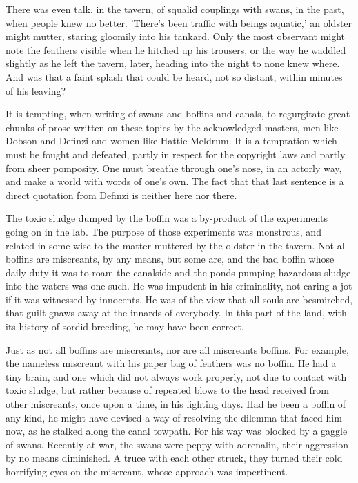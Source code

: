 There was even talk, in the tavern, of squalid couplings with swans, in the past, when people knew no better. 'There's been traffic with beings aquatic,' an oldster might mutter, staring gloomily into his tankard. Only the most observant might note the feathers visible when he hitched up his trousers, or the way he waddled slightly as he left the tavern, later, heading into the night to none knew where. And was that a faint splash that could be heard, not so distant, within minutes of his leaving?

It is tempting, when writing of swans and boffins and canals, to regurgitate great chunks of prose written on these topics by the acknowledged masters, men like Dobson and Definzi and women like Hattie Meldrum. It is a temptation which must be fought and defeated, partly in respect for the copyright laws and partly from sheer pomposity. One must breathe through one's nose, in an actorly way, and make a world with words of one's own. The fact that that last sentence is a direct quotation from Definzi is neither here nor there.

The toxic sludge dumped by the boffin was a by-product of the experiments going on in the lab. The purpose of those experiments was monstrous, and related in some wise to the matter muttered by the oldster in the tavern. Not all boffins are miscreants, by any means, but some are, and the bad boffin whose daily duty it was to roam the canalside and the ponds pumping hazardous sludge into the waters was one such. He was impudent in his criminality, not caring a jot if it was witnessed by innocents. He was of the view that all souls are besmirched, that guilt gnaws away at the innards of everybody. In this part of the land, with its history of sordid breeding, he may have been correct.

Just as not all boffins are miscreants, nor are all miscreants boffins. For example, the nameless miscreant with his paper bag of feathers was no boffin. He had a tiny brain, and one which did not always work properly, not due to contact with toxic sludge, but rather because of repeated blows to the head received from other miscreants, once upon a time, in his fighting days. Had he been a boffin of any kind, he might have devised a way of resolving the dilemma that faced him now, as he stalked along the canal towpath. For his way was blocked by a gaggle of swans. Recently at war, the swans were peppy with adrenalin, their aggression by no means diminished. A truce with each other struck, they turned their cold horrifying eyes on the miscreant, whose approach was impertinent.

